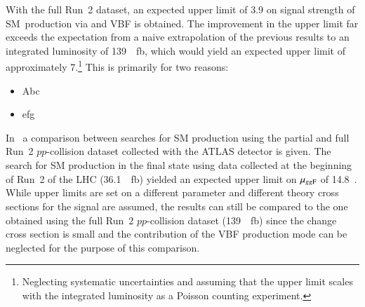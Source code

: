 With the full Run~2 dataset, an expected upper limit of
3.9 on signal strength of SM~\HH production via \ggF and VBF is obtained. The
improvement in the upper limit far exceeds the expectation from a naive
extrapolation of the previous results to an integrated luminosity of
\SI{139}{\per\femto\barn}, which would yield an expected upper limit of
approximately 7.\footnote{Neglecting systematic uncertainties and assuming that
  the upper limit scales with the integrated luminosity as a Poisson counting
  experiment.} This is primarily for two reasons:
\begin{itemize}

\item Abc

\item efg

\end{itemize}

\vspace{10em}

In~ a comparison between
searches for SM \HH production using the partial and full Run~2 $pp$-collision
dataset collected with the ATLAS detector is given. The search for SM \HH
production in the \bbtautau final state using data collected at the beginning of
Run~2 of the LHC (\SI{36.1}{\per\femto\barn}) yielded an expected upper limit on
$\mu_{gg\text{F}}$ of 14.8~\cite{HIGG-2016-16-witherratum}. While upper limits are set
on a different parameter and different theory cross sections for the signal are
assumed, the results can still be compared to the one obtained using the full
Run~2 $pp$-collision dataset (\SI{139}{\per\femto\barn}) since the change cross
section is small and the contribution of the VBF production mode can be
neglected for the purpose of this comparison.



